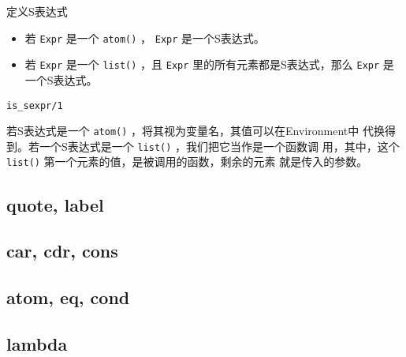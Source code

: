 \documentclass[preview,multi,crop=false,border=1in,class=memoir]{standalone}
\begin{document}
\begin{preview-page}
定义S表达式 \cite{McCarthy:1960:symbolic}

\begin{itemize}
\item 若 \verb|Expr| 是一个 \verb|atom()| ， \verb|Expr| 是一个S表达式。
\item 若 \verb|Expr| 是一个 \verb|list()| ，且 \verb|Expr| 里的所有元素都是S表达式，那么 \verb|Expr| 是一个S表达式。
\end{itemize}

\begin{Exercise}[difficulty=1]
\verb|is_sexpr/1|
\end{Exercise}

\nonzeroparskip

若S表达式是一个 \verb|atom()| ，将其视为变量名，其值可以在Environment中
代换得到。若一个S表达式是一个 \verb|list()| ，我们把它当作是一个函数调
用，其中，这个 \verb|list()| 第一个元素的值，是被调用的函数，剩余的元素
就是传入的参数。

\subsection{quote, label}

\subsection{car, cdr, cons}

\subsection{atom, eq, cond}

\subsection{lambda}



\end{preview-page}
\end{document}
